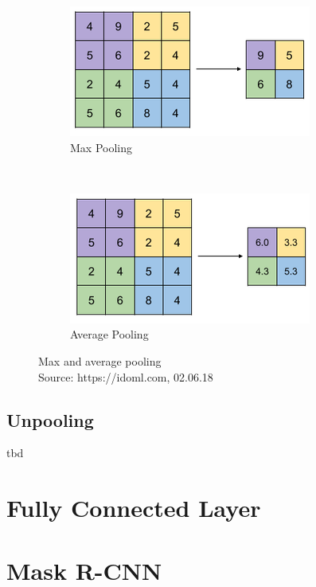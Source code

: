 \begin{figure}[H]
    \centering
	\begin{subfigure}{0.4\textwidth}
    	\includegraphics[width=0.9\linewidth]{chapters/neural_networks/images/max_pooling.png}		    \caption{Max Pooling}
    	\label{fig:challenges:max_pooling}
	\end{subfigure}~
	\begin{subfigure}{0.4\textwidth}
    	\includegraphics[width=0.9\linewidth]{chapters/neural_networks/images/avg_pooling.png}       	\caption{Average Pooling}
    	\label{fig:challenges:avg_pooling}
	\end{subfigure}
	\caption{Max and average pooling\\Source: https://idoml.com, 02.06.18}
	\label{fig:challenges:pooling}
\end{figure}

\subsection{Unpooling}
tbd

\section{Fully Connected Layer}
\section{Mask R-CNN}

